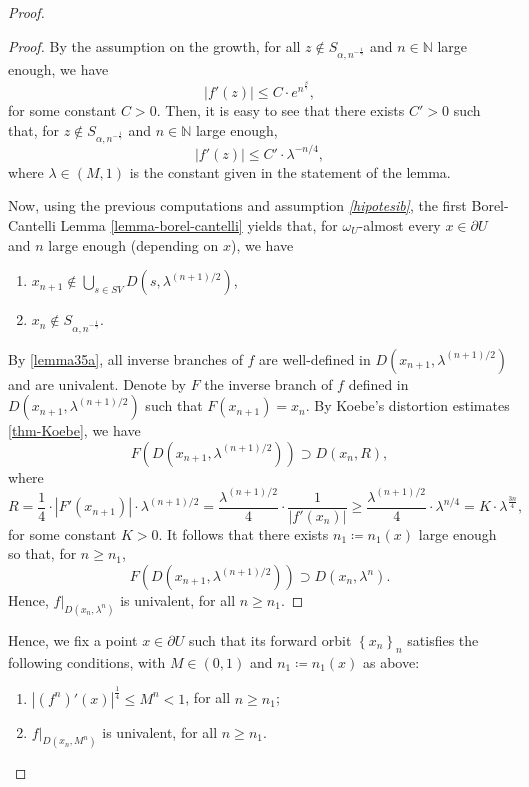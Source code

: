 \documentclass[11pt]{article}
\theoremstyle{definition}
\theoremstyle{remark}
\theoremstyle{plain}
\begin{document}
\begin{proof}
\begin{proof}
		By the assumption on the growth, for all $ z\notin S_{\alpha, n^{-\frac{1}{\gamma}}} $ and $ n\in\mathbb{N} $ large enough, we have $$ \left| f'(z)\right| \leq C\cdot e^{n^{\frac{\beta}{\gamma}}} ,$$ for some constant $ C>0 $. Then, it is easy to see  that there exists  $ C'>0 $ such that, for $ z\notin S_{\alpha, n^{-\frac{1}{\gamma}}} $ and $ n\in\mathbb{N} $ large enough, $$ \left| f'(z)\right| \leq C'\cdot \lambda ^{-n/4},$$ where $ \lambda\in (M,1) $ is the constant given in the statement of the lemma. 
		
		Now, using the previous computations and assumption {\em \ref{hipotesib}}, the first Borel-Cantelli Lemma \ref{lemma-borel-cantelli} yields that, for $ \omega_U $-almost every $ x\in \partial U $ and $ n $ large enough (depending on $ x $), we have \begin{enumerate}[label={(1.\arabic*)}]
			\item\label{lemma35a} $ x_{n+1}\notin \bigcup\limits_{s\in SV}D(s, \lambda^{(n+1)/2}) $, 
			\item $ x_{n}\notin   S_{\alpha, n^{-\frac{1}{\gamma}}}$.
		\end{enumerate}
		
		By \ref{lemma35a}, all inverse branches of $ f $ are well-defined in $ D(x_{n+1}, \lambda^{(n+1)/2}) $ and are univalent. Denote by $ F $ the inverse branch of $ f $ defined in  $ D(x_{n+1}, \lambda^{(n+1)/2}) $ such that $ F(x_{n+1})=x_n $. By Koebe's distortion estimates \ref{thm-Koebe}, we have 
		\[F(D(x_{n+1}, {\lambda^{(n+1)/2}}))\supset D(x_n, R),\]where \[R=\frac14\cdot \left| F'(x_{n+1})\right|\cdot {\lambda^{(n+1)/2}}
		=\frac{\lambda^{(n+1)/2}}{4}\cdot\frac1 {\left| f'(x_n)\right|}\geq \frac{\lambda^{(n+1)/2}}{4}\cdot \lambda^{n/4}=K\cdot \lambda^\frac{3n}4,\]for some constant $ K>0 $. 
		It follows that there exists $ n_1\coloneqq n_1(x)$ large enough so that, for $ n\geq n_1 $,
		\[F(D(x_{n+1}, {\lambda^{(n+1)/2}}))\supset D(x_n, \lambda^n).\]
		Hence, $ f|_{D(x_n, \lambda^n)} $ is univalent, for all $ n\geq n_1 $.
	\end{proof}
	
	Hence, we fix a point $ x\in \partial U $ such that its forward orbit $ \left\lbrace x_n\right\rbrace _n $ satisfies the following conditions, with $ M\in (0,1) $ and $ n_1\coloneqq n_1(x) $ as above:
	\begin{enumerate}[label={(2.\arabic*)}]
		\item  $ \left| (f^n)'(x)\right| ^\frac{1}{4}\leq M^n<1 $, for all $ n\geq n_1 $;
		\item $ f|_{D(x_n, M^n)} $ is univalent, for all $ n\geq n_1 $.
	\end{enumerate}
	

\end{proof}
\end{document}
